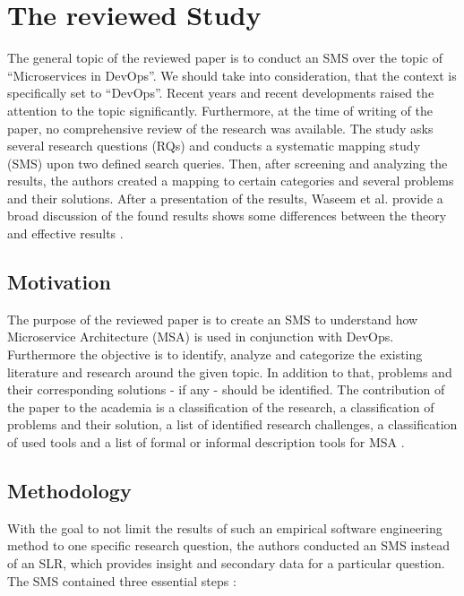 \section{The reviewed Study}
\label{sec:summary}

The general topic of the reviewed paper is to conduct an SMS over the topic
of ``Microservices in DevOps''. We should take into consideration, that the context
is specifically set to ``DevOps''. Recent years and recent developments
raised the attention to the topic significantly. Furthermore, at the
time of writing of the paper, no comprehensive review of the research was
available. The study asks several research questions (RQs) and conducts
a systematic mapping study (SMS) upon two defined search queries. Then,
after screening and analyzing the results, the authors created a mapping
to certain categories and several problems and their solutions.
After a presentation of the results, Waseem et al. provide a broad discussion of the found
results shows some differences between the theory and effective
results \cite{waseem:SMSMSADevOps}.

\subsection{Motivation}

The purpose of the reviewed paper is to create an SMS to understand how
Microservice Architecture (MSA) is used in conjunction with DevOps.
Furthermore the objective is to identify, analyze and categorize the
existing literature and research around the given topic.
In addition to that, problems and their corresponding solutions - if any - should
be identified. The contribution of the paper to the
academia is a classification of the research, a classification of problems
and their solution, a list of identified research challenges, a classification of
used tools and a list of formal or informal description
tools for MSA \cite{waseem:SMSMSADevOps}.

\subsection{Methodology}

With the goal to not limit the results of such an empirical software engineering method
to one specific research question, the authors conducted an SMS instead of an SLR,
which provides insight and secondary data for a particular question.
The SMS contained three essential steps \cite{waseem:SMSMSADevOps}:

